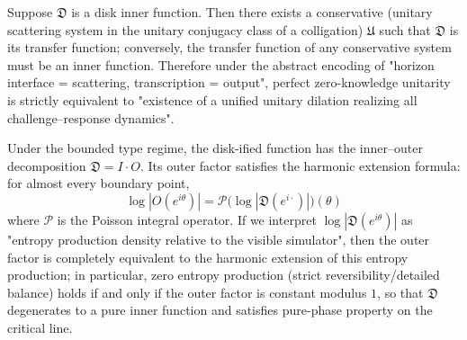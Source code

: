 \begin{theorem}\label{thm:xi-inner-iff-conservative-colligation}
Suppose \(\mathfrak{D}\) is a disk inner function.
Then there exists a conservative (unitary scattering system in the unitary conjugacy class of a colligation) \(\mathfrak{U}\) such that \(\mathfrak{D}\) is its transfer function; conversely, the transfer function of any conservative system must be an inner function.
Therefore under the abstract encoding of "horizon interface = scattering, transcription = output", perfect zero-knowledge unitarity is strictly equivalent to "existence of a unified unitary dilation realizing all challenge--response dynamics".
\end{theorem}

\begin{proposition}\label{prop:xi-entropy-production-equals-outer-factor}
Under the bounded type regime, the disk-ified function has the inner--outer decomposition \(\mathfrak{D}=I\cdot O\).
Its outer factor satisfies the harmonic extension formula: for almost every boundary point,
\[
\boxed{\;
\log|O(e^{i\theta})|
=\mathcal{P}\!\bigl(\log|\mathfrak{D}(e^{i\cdot})|\bigr)(\theta)\;}
\]
where \(\mathcal{P}\) is the Poisson integral operator.
If we interpret \(\log|\mathfrak{D}(e^{i\theta})|\) as "entropy production density relative to the visible simulator", then the outer factor is completely equivalent to the harmonic extension of this entropy production;
in particular, zero entropy production (strict reversibility/detailed balance) holds if and only if the outer factor is constant modulus \(1\), so that \(\mathfrak{D}\) degenerates to a pure inner function and satisfies pure-phase property on the critical line.
\end{proposition}

